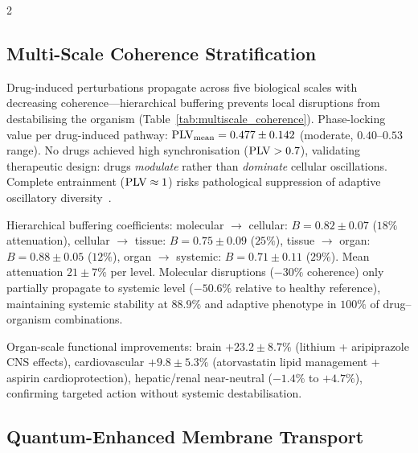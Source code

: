 \begin{multicols}{2}

\subsection{Multi-Scale Coherence Stratification}
\label{ssec:multiscale}

Drug-induced perturbations propagate across five biological scales with
decreasing coherence---hierarchical buffering prevents local disruptions
from destabilising the organism (Table~\ref{tab:multiscale_coherence}).
Phase-locking value per drug-induced pathway: $\text{PLV}_{\text{mean}} =
0.477\pm0.142$ (moderate, $0.40$--$0.53$ range).  No drugs achieved high
synchronisation ($\text{PLV} > 0.7$), validating therapeutic design: drugs
\emph{modulate} rather than \emph{dominate} cellular oscillations.
Complete entrainment ($\text{PLV}\approx1$) risks pathological suppression of
adaptive oscillatory diversity~\citep{Strogatz2018}.

Hierarchical buffering coefficients:
molecular $\to$ cellular: $B = 0.82\pm0.07$ ($18\%$ attenuation),
cellular $\to$ tissue: $B = 0.75\pm0.09$ ($25\%$),
tissue $\to$ organ: $B = 0.88\pm0.05$ ($12\%$),
organ $\to$ systemic: $B = 0.71\pm0.11$ ($29\%$).
Mean attenuation $21\pm7\%$ per level.  Molecular disruptions ($-30\%$
coherence) only partially propagate to systemic level ($-50.6\%$ relative
to healthy reference), maintaining systemic stability at $88.9\%$ and
adaptive phenotype in $100\%$ of drug--organism combinations.

Organ-scale functional improvements: brain $+23.2\pm8.7\%$ (lithium +
aripiprazole CNS effects), cardiovascular $+9.8\pm5.3\%$ (atorvastatin
lipid management + aspirin cardioprotection), hepatic/renal near-neutral
($-1.4\%$ to $+4.7\%$), confirming targeted action without systemic
destabilisation.

\subsection{Quantum-Enhanced Membrane Transport}
\label{ssec:quantum_transport}


\end{multicols}
